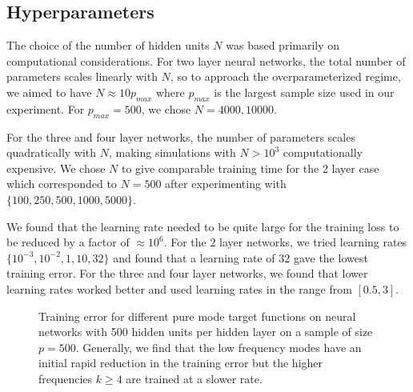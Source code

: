 \documentclass{article}
\begin{document}
\subsection{Hyperparameters}

The choice of the number of hidden units $N$ was based primarily on computational considerations. For two layer neural networks, the total number of parameters scales linearly with $N$, so to approach the overparameterized regime, we aimed to have $N \approx 10 p_{max}$ where $p_{max}$ is the largest sample size used in our experiment. For $p_{max}=500$, we chose $N=4000, 10000$. 

For the three and four layer networks, the number of parameters scales quadratically with $N$, making simulations with $N > 10^3$ computationally expensive. We chose $N$ to give comparable training time for the 2 layer case which corresponded to $N=500$ after experimenting with $\{100,250,500,1000,5000\}$. 

We found that the learning rate needed to be quite large for the training loss to be reduced by a factor of $\approx 10^{6}$. For the 2 layer networks, we tried learning rates $\{10^{-3},10^{-2},1,10,32\}$ and found that a learning rate of 32 gave the lowest training error. For the three and four layer networks, we found that lower learning rates worked better and used learning rates in the range from $[0.5,3]$.

\begin{figure}[t]

\vskip -8pt
\caption{Training error for different pure mode target functions on neural networks with 500 hidden units per hidden layer on a sample of size $p=500$. Generally, we find that the low frequency modes have an initial rapid reduction in the training error but the higher frequencies $k \geq 4$ are trained at a slower rate.}
\label{fig:train_err}
\end{figure}
\end{document}
